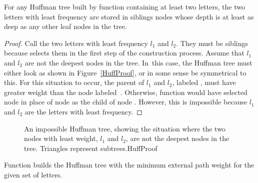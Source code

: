 \begin{lemma}
For any Huffman tree built by function  containing at
least two letters, the two letters with least frequency are stored in
siblings nodes whose depth is at least as deep as any other leaf nodes
in the tree.
\end{lemma}

\begin{proof}
Call the two letters with least frequency \(l_1\) and \(l_2\).
They must be siblings because 
selects them in the first step of the construction process.
Assume that \(l_1\) and \(l_2\) are not the deepest nodes in the tree.
In~this case, the Huffman tree must either look as shown in
Figure~\ref{HuffProof}, or in some sense be symmetrical to this.
For this situation to occur, the parent of \(l_1\) and \(l_2\),
labeled , must have greater weight than the node
labeled~.
Otherwise, function  would have selected node
 in place of node  as the child of node .
However, this is impossible because \(l_1\) and \(l_2\) are the letters
with least frequency.
\end{proof}

\begin{figure}

{An impossible Huffman tree, showing the situation where the two nodes 
with least weight, \(l_1\) and \(l_2\), are not the deepest nodes in
the tree.
Triangles represent subtrees.}{HuffProof}
\bigskip
\end{figure}

\begin{theorem}
Function  builds the Huffman tree with the minimum
external path weight for the given set of letters.
\end{theorem}

